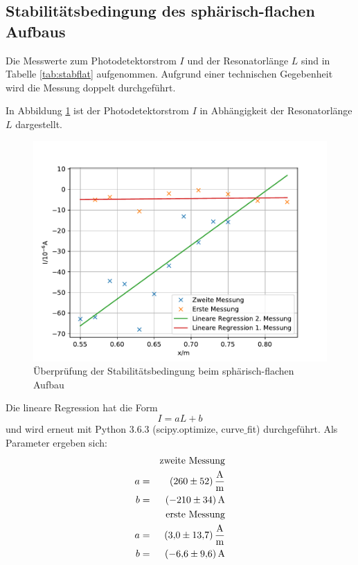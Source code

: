 \subsection{Stabilitätsbedingung des sphärisch-flachen Aufbaus}
Die Messwerte zum Photodetektorstrom $I$ und der Resonatorlänge $L$ sind in Tabelle \ref{tab:stabflat} aufgenommen.
Aufgrund einer technischen Gegebenheit wird die Messung doppelt durchgeführt.

In Abbildung \ref{fig:stabflat} ist der Photodetektorstrom $I$ in Abhängigkeit der Resonatorlänge $L$ dargestellt.
\begin{figure}
  \centering
  \includegraphics[width=\textwidth]{stabflat.pdf}
  \caption{Überprüfung der Stabilitätsbedingung beim sphärisch-flachen Aufbau}
  \label{fig:stabflat}
\end{figure}
Die lineare Regression hat die Form
\begin{equation*}
  I= aL+b
\end{equation*}
und wird erneut mit Python 3.6.3 (scipy.optimize, curve$\_$fit) durchgeführt.
Als Parameter ergeben sich:
\begin{align*}
&&\text{zweite Messung} \\
a &=& \SI{  260 \pm 52 }{\frac{A}{m}} \\
b &=& \SI{ -210 \pm 34 }{A} \\
&&\text{erste Messung} \\
a &=& \SI{  3.0 \pm 13.7 }{\frac{A}{m}} \\
b &=& \SI{ -6.6 \pm 9.6 }{A} \\
\end{align*}
%
%
\FloatBarrier

